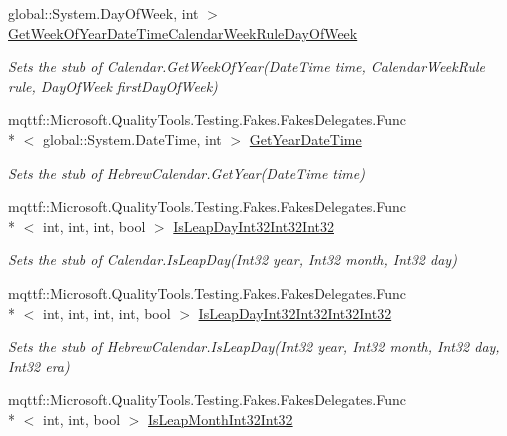 \begin{DoxyCompactItemize}
global\-::\-System.\-Day\-Of\-Week, int $>$ \hyperlink{class_system_1_1_globalization_1_1_fakes_1_1_stub_hebrew_calendar_a073e9c0685d13994575e8d273bdc8bd2}{Get\-Week\-Of\-Year\-Date\-Time\-Calendar\-Week\-Rule\-Day\-Of\-Week}
\begin{DoxyCompactList}\small\item\em Sets the stub of Calendar.\-Get\-Week\-Of\-Year(\-Date\-Time time, Calendar\-Week\-Rule rule, Day\-Of\-Week first\-Day\-Of\-Week)\end{DoxyCompactList}\item 
mqttf\-::\-Microsoft.\-Quality\-Tools.\-Testing.\-Fakes.\-Fakes\-Delegates.\-Func\\*
$<$ global\-::\-System.\-Date\-Time, int $>$ \hyperlink{class_system_1_1_globalization_1_1_fakes_1_1_stub_hebrew_calendar_a2dc6e1741fe777469ff86d2a6ab01ddc}{Get\-Year\-Date\-Time}
\begin{DoxyCompactList}\small\item\em Sets the stub of Hebrew\-Calendar.\-Get\-Year(\-Date\-Time time)\end{DoxyCompactList}\item 
mqttf\-::\-Microsoft.\-Quality\-Tools.\-Testing.\-Fakes.\-Fakes\-Delegates.\-Func\\*
$<$ int, int, int, bool $>$ \hyperlink{class_system_1_1_globalization_1_1_fakes_1_1_stub_hebrew_calendar_a84abcdf6a22c40b78fd177eacc29cc29}{Is\-Leap\-Day\-Int32\-Int32\-Int32}
\begin{DoxyCompactList}\small\item\em Sets the stub of Calendar.\-Is\-Leap\-Day(\-Int32 year, Int32 month, Int32 day)\end{DoxyCompactList}\item 
mqttf\-::\-Microsoft.\-Quality\-Tools.\-Testing.\-Fakes.\-Fakes\-Delegates.\-Func\\*
$<$ int, int, int, int, bool $>$ \hyperlink{class_system_1_1_globalization_1_1_fakes_1_1_stub_hebrew_calendar_aca96bc82f231677117bd69621fe5b154}{Is\-Leap\-Day\-Int32\-Int32\-Int32\-Int32}
\begin{DoxyCompactList}\small\item\em Sets the stub of Hebrew\-Calendar.\-Is\-Leap\-Day(\-Int32 year, Int32 month, Int32 day, Int32 era)\end{DoxyCompactList}\item 
mqttf\-::\-Microsoft.\-Quality\-Tools.\-Testing.\-Fakes.\-Fakes\-Delegates.\-Func\\*
$<$ int, int, bool $>$ \hyperlink{class_system_1_1_globalization_1_1_fakes_1_1_stub_hebrew_calendar_ab3ecbffa03820cef37341d1536af9dde}{Is\-Leap\-Month\-Int32\-Int32}

\end{DoxyCompactItemize}
